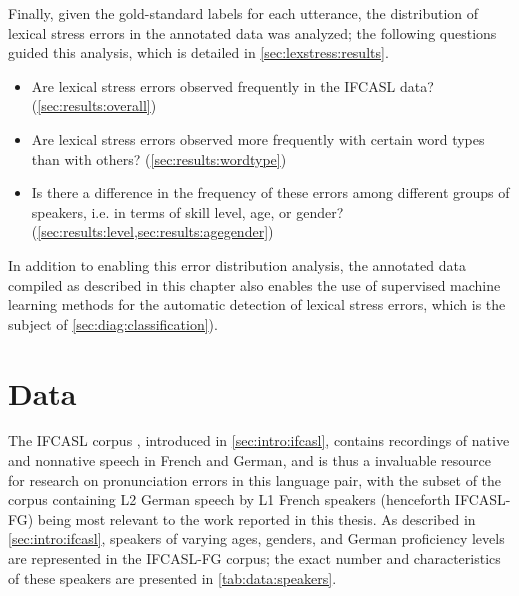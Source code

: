 	Finally, given the gold-standard labels for each utterance, the distribution of lexical stress errors in the annotated data was analyzed; the following questions guided this analysis, which is detailed in \cref{sec:lexstress:results}.
	\begin{itemize}
	\item{Are lexical stress errors observed frequently in the IFCASL data? (\cref{sec:results:overall})}
		\item{Are lexical stress errors observed more frequently with certain word types than with others?  (\cref{sec:results:wordtype})}
	\item{Is there a difference in the frequency of these errors among different groups of speakers, i.e. in terms of skill level, age, or gender? (\cref{sec:results:level,sec:results:agegender})}
	\end{itemize}
	
 
	
	In addition to enabling this error distribution analysis, the annotated data compiled as described in this chapter also enables the use of supervised machine learning methods for the automatic detection of lexical stress errors, which is the subject of \cref{sec:diag:classification}).
	
	\section{Data}
	\label{sec:lexstress:data}
	
	The IFCASL corpus \citep{Trouvain2013,Fauth2014}, introduced in \cref{sec:intro:ifcasl}, contains recordings of native and nonnative speech in French and German, and is thus a invaluable resource for research on pronunciation errors in this language pair, with the subset of the corpus containing L2 German speech by L1 French speakers (henceforth IFCASL-FG) being most relevant to the work reported in this thesis. As described in \cref{sec:intro:ifcasl}, speakers of varying ages, genders, and German proficiency levels are represented in the IFCASL-FG corpus; the exact number and characteristics of these speakers are presented in \cref{tab:data:speakers}.
	
